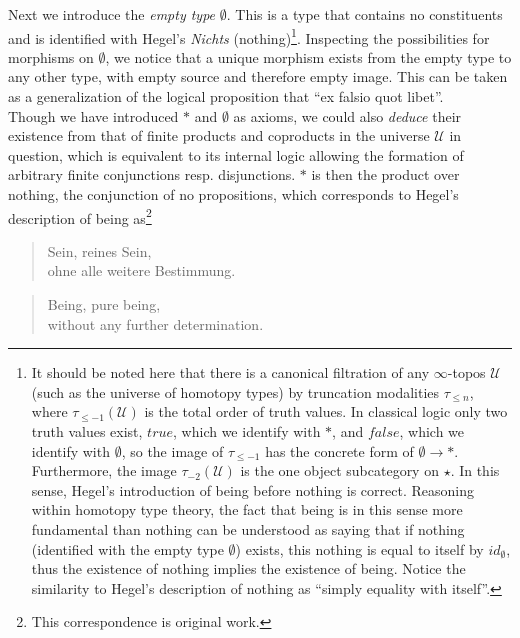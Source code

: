 \documentclass{article}
\begin{document}
Next we introduce the \emph{empty type} $\emptyset$. This is a type that contains no constituents and is identified with Hegel's \emph{Nichts} (nothing)\footnote{It should be noted here that there is a canonical filtration of any $\infty$-topos $\mathcal{U}$ (such as the universe of homotopy types) by truncation modalities $\tau_{\leq n}$, where $\tau_{\leq -1}(\mathcal{U})$ is the total order of truth values. In classical logic only two truth values exist, $true$, which we identify with $*$, and $false$, which we identify with $\emptyset$, so the image of $\tau_{\leq -1}$ has the concrete form of $\emptyset\rightarrow *$. Furthermore, the image $\tau_{-2}(\mathcal{U})$ is the one object subcategory on $\star$. In this sense, Hegel's introduction of being before nothing is correct. Reasoning within homotopy type theory, the fact that being is in this sense more fundamental than nothing can be understood as saying that if nothing (identified with the empty type $\emptyset$) exists, this nothing is equal to itself by $id_\emptyset$, thus the existence of nothing implies the existence of being. Notice the similarity to Hegel's description of nothing as ``simply equality with itself''.}. Inspecting the possibilities for morphisms on $\emptyset$, we notice that a unique morphism exists from the empty type to any other type, with empty source and therefore empty image. This can be taken as a generalization of the logical proposition that ``ex falsio quot libet''. \\

Though we have introduced $*$ and $\emptyset$ as axioms, we could also \emph{deduce} their existence from that of finite products and coproducts in the universe $\mathcal{U}$ in question, which is equivalent to its internal logic allowing the formation of arbitrary finite conjunctions resp. disjunctions. $*$ is then the product over nothing, the conjunction of no propositions, which corresponds to Hegel's description of being as\footnote{This correspondence is original work.} 

\begin{quote}
    Sein, reines Sein, \\
    ohne alle weitere Bestimmung.
\end{quote}

\begin{quote}
    Being, pure being, \\ 
    without any further determination.
\end{quote}

 
\end{document}
